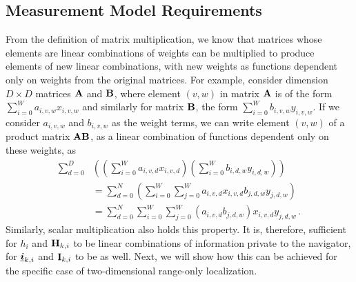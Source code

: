 \documentclass[10pt,letterpaper,oneside,twocolumn,journal]{IEEEtran}
\theoremstyle{definition}
\theoremstyle{definition}
\theoremstyle{remark}
\begin{document}
% 
% 

\subsection{Measurement Model Requirements}
From the definition of matrix multiplication, we know that matrices whose elements are linear combinations of weights can be multiplied to produce elements of new linear combinations, with new weights as functions dependent only on weights from the original matrices. For example, consider dimension $D\times D$ matrices ${{\mathbf{A}}}$ and ${{\mathbf{B}}}$, where element $(v,w)$ in matrix ${{\mathbf{A}}}$ is of the form $\sum_{i=0}^W a_{i,v,w}x_{i,v,w}$ and similarly for matrix ${{\mathbf{B}}}$, the form $\sum_{i=0}^W b_{i,v,w}y_{i,v,w}$. If we consider $a_{i,v,w}$ and $b_{i,v,w}$ as the weight terms, we can write element $(v,w)$ of a product matrix ${{\mathbf{A}}}{{\mathbf{B}}}$, as a linear combination of functions dependent only on these weights, as
\begin{equation}
    \begin{split}
        \sum_{d=0}^D&\left(\left(\sum_{i=0}^W a_{i,v,d}x_{i,v,d}\right)\left(\sum_{i=0}^W b_{i,d,w}y_{i,d,w}\right)\right) \\
        &=\sum_{d=0}^N\left(\sum_{i=0}^W\sum_{j=0}^W a_{i,v,d}x_{i,v,d}b_{j,d,w}y_{j,d,w}\right) \\
        &=\sum_{d=0}^N\sum_{i=0}^W\sum_{j=0}^W (a_{i,v,d}b_{j,d,w})x_{i,v,d}y_{j,d,w}\,.
    \end{split} \label{eqn:matrix_mult_weights}
\end{equation}
Similarly, scalar multiplication also holds this property. It is, therefore, sufficient for $h_i$ and ${{\mathbf{H}}}_{k,i}$ to be linear combinations of information private to the navigator, for ${\boldsymbol{\underline{i}}}_{k,i}$ and ${{\mathbf{I}}}_{k,i}$ to be as well. Next, we will show how this can be achieved for the specific case of two-dimensional range-only localization.

% 
% 
\end{document}
